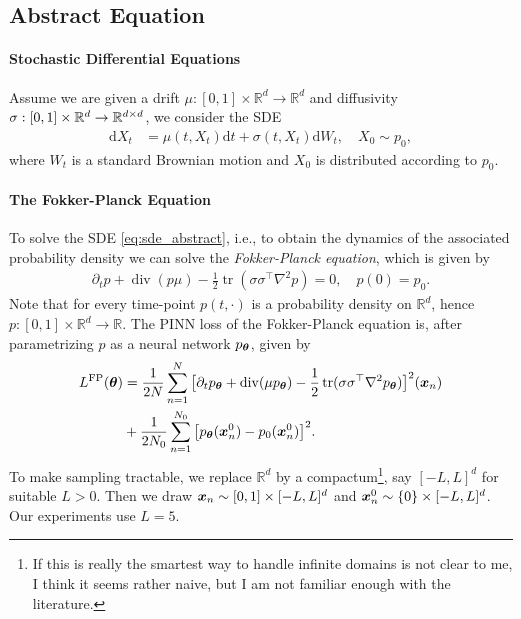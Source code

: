 \subsection{Abstract Equation}
\paragraph{Stochastic Differential Equations}
Assume we are given a drift $\mu:[0,1]\times \mathbb R^d\to\mathbb R^d$ and diffusivity $\sigma:[0,1] \times {\mathbb{R}}^d \to \mathbb R^{d\times d}$, we consider the SDE
\begin{align}\label{eq:sde_abstract}
  \mathrm dX_t
  &=
    \mu(t, X_t)\mathrm d t
    +
    \sigma(t, X_t) \mathrm d W_t,
    \quad
    X_0 \sim p_0,
\end{align}
where $W_t$ is a standard Brownian motion and $X_0$ is distributed according to $p_0$.

\paragraph{The Fokker-Planck Equation}
To solve the SDE \eqref{eq:sde_abstract}, i.e., to obtain the dynamics of the associated probability density we can solve the \emph{Fokker-Planck equation}, which is given by
\begin{align}\label{eq:fokker_planck_abstract}
  \partial_t p
  +
  \operatorname{div}(p\mu)
  -
  \frac12 \operatorname{tr}(\sigma \sigma^\top\nabla^2 p)
  =
  0,
  \quad
  p(0) = p_0.
\end{align}
Note that for every time-point $p(t,\cdot)$ is a probability density on $\mathbb R^d$, hence $p:[0,1]\times\mathbb R^d \to \mathbb R$. The PINN loss of the Fokker-Planck equation is, after parametrizing $p$ as a neural network $p_{{\bm{\theta}}}$, given by
\begin{align*}
  L^{\textrm{FP}}({\bm{\theta}})
  &=
    \frac{1}{2N}
    \sum_{n=1}^{N}
    \big[
    \partial_t p_{{\bm{\theta}}}
    +
    \operatorname{div}(\mu p_{{\bm{\theta}}})
    -
    \frac12 \operatorname{tr}(\sigma\sigma^\top\nabla^2 p_{{\bm{\theta}}})
    \big]^2
    ({\bm{x}}_n)
  \\
  &+
    \frac{1}{2 N_0}
    \sum_{n=1}^{N_0}
    \big[
    p_{{\bm{\theta}}}({\bm{x}}_n^0) - p_0({\bm{x}}_n^0)
    \big]^2.
\end{align*}
To make sampling tractable, we replace $\mathbb R^d$ by a compactum\footnote{If this is really the smartest way to handle infinite domains is not clear to me, I think it seems rather naive, but I am not familiar enough with the literature.}, say $[-L, L]^d$ for suitable $L>0$. Then we draw ${\bm{x}}_n \sim [0, 1] \times [-L, L]^d$ and ${\bm{x}}_n^0 \sim \{0\} \times [-L, L]^d$. Our experiments use $L=5$.


